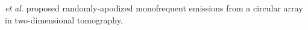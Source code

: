  \emph{et al.}
\cite{letter:VanSlounITBME2015} proposed
randomly-apodized monofrequent emissions from
a circular array in
two-dimensional tomography.
